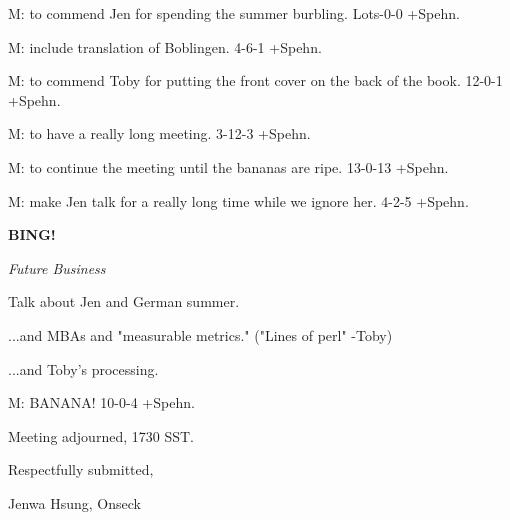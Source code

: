 \documentclass[12pt]{article}
\newcommand{\bing}{{\bf BING!} }
\newcommand{\goto}[1]{\bing \vskip 12pt \centerline{{\em{#1}}}}
\begin{document}
M: to commend Jen for spending the summer burbling. Lots-0-0 +Spehn.

M: include translation of Boblingen. 4-6-1 +Spehn.

M: to commend Toby for putting the front cover on the back of the book. 12-0-1 +Spehn.

M: to have a really long meeting. 3-12-3 +Spehn.

M: to continue the meeting until the bananas are ripe. 13-0-13 +Spehn.

M: make Jen talk for a really long time while we ignore her. 4-2-5 +Spehn.

\goto{Future Business}

Talk about Jen and German summer.

...and MBAs and "measurable metrics." ("Lines of perl" -Toby)

...and Toby's processing.

M: BANANA! 10-0-4 +Spehn.

\vspace{12pt}

\noindent
Meeting adjourned, 1730 SST.

\vspace{18pt}

\centerline{Respectfully submitted,}
\centerline{Jenwa Hsung, Onseck}
\end{document}
